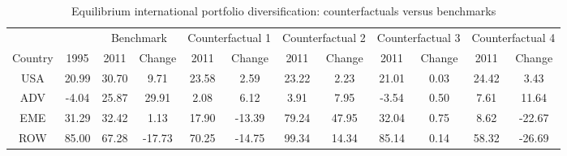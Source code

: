 \begin{table}[p]
\begin{center}
\caption{Equilibrium international portfolio diversification: counterfactuals versus benchmarks}
\label{tab:results-div-bench-counter}
\small
\begin{tabular}{cccccccccccc}
\toprule
& & \multicolumn{2}{c}{Benchmark}& \multicolumn{2}{c}{Counterfactual 1}& \multicolumn{2}{c}{Counterfactual 2}& \multicolumn{2}{c}{Counterfactual 3}& \multicolumn{2}{c}{Counterfactual 4}\\
\cmidrule(rl){3-4}\cmidrule(rl){5-6}\cmidrule(rl){7-8}\cmidrule(rl){9-10}\cmidrule(rl){11-12}
Country & 1995 & 2011 & Change & 2011 & Change & 2011 & Change & 2011 & Change & 2011 & Change\\
\midrule
USA&20.99&30.70&9.71&23.58&2.59&23.22&2.23&21.01&0.03&24.42&3.43\\
ADV&-4.04&25.87&29.91&2.08&6.12&3.91&7.95&-3.54&0.50&7.61&11.64\\
EME&31.29&32.42&1.13&17.90&-13.39&79.24&47.95&32.04&0.75&8.62&-22.67\\
ROW&85.00&67.28&-17.73&70.25&-14.75&99.34&14.34&85.14&0.14&58.32&-26.69\\
\bottomrule
\end{tabular}
\normalsize
\end{center}
\end{table}
